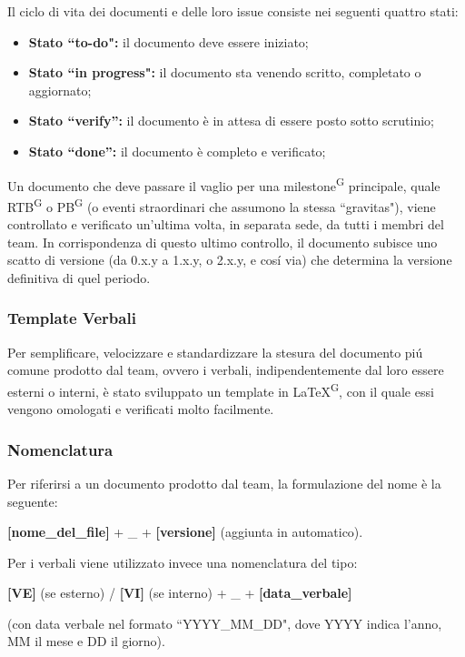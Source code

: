 \documentclass[8pt]{article}
\newcommand{\glossterm}[1]{#1\textsuperscript{G}} %
\begin{document}
    Il ciclo di vita dei documenti e delle loro issue consiste nei seguenti quattro stati:
\begin{itemize} 
    \item \textbf{Stato ``to-do":} il documento deve essere iniziato;
    \item \textbf{Stato ``in progress":} il documento sta venendo scritto, completato o aggiornato;
    \item \textbf{Stato ``verify'':} il documento è in attesa di essere posto sotto scrutinio;
    \item \textbf{Stato ``done'':} il documento è completo e verificato;
\end{itemize}
Un documento che deve passare il vaglio per una \glossterm{milestone} principale, quale \glossterm{RTB} o \glossterm{PB} (o eventi straordinari che assumono la stessa ``gravitas"), viene controllato e verificato un'ultima volta, in separata sede, da tutti i membri del team.
In corrispondenza di questo ultimo controllo, il documento subisce uno scatto di versione (da 0.x.y a 1.x.y, o 2.x.y, e cosí via) che determina la versione definitiva di quel periodo.

\subsubsection{Template Verbali}
Per semplificare, velocizzare e standardizzare la stesura del documento piú comune prodotto dal
team, ovvero i verbali, indipendentemente dal loro essere esterni o interni, è stato sviluppato un template in \glossterm{\LaTeX}, con il quale essi vengono omologati e verificati molto facilmente.
\subsubsection{Nomenclatura}
Per riferirsi a un documento prodotto dal team, la formulazione del nome è la seguente:
\begin{center}
\textbf{[nome\_del\_file]} + \_ + \textbf{[versione]} (aggiunta in automatico). 
\end{center}
Per i verbali viene utilizzato invece una nomenclatura del tipo:
\begin{center}
\textbf{[VE]} (se esterno) / \textbf{[VI]} (se interno) + \_ + \textbf{[data\_verbale]}
\end{center}
(con data verbale nel formato ``YYYY\_MM\_DD", dove YYYY indica l'anno, MM il mese e DD il giorno). 
\end{document}
